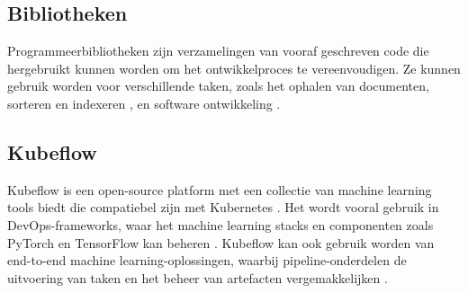 \subsection{Bibliotheken}
Programmeerbibliotheken zijn verzamelingen van vooraf geschreven code die hergebruikt kunnen worden om het ontwikkelproces te vereenvoudigen. Ze kunnen gebruik worden voor verschillende taken, zoals het ophalen van documenten, sorteren en indexeren \autocite{CharlesDavis1988}, en software ontwikkeling \autocite{Denert1979}.
\subsection{Kubeflow}
Kubeflow is een open-source platform met een collectie van machine learning tools biedt die compatiebel zijn met Kubernetes \autocite{Stein2020}. Het wordt vooral gebruik in DevOps-frameworks, waar het machine learning stacks en componenten zoals PyTorch en TensorFlow kan beheren \autocite{NGC2021}.
Kubeflow kan ook gebruik worden van end-to-end machine learning-oplossingen, waarbij pipeline-onderdelen de uitvoering van taken en het beheer van artefacten vergemakkelijken \autocite{Bisong2019}.






